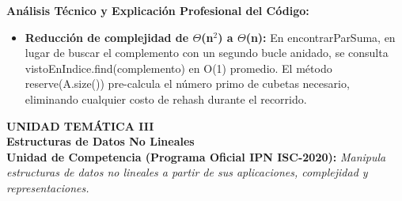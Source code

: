 \documentclass[11pt,letterpaper]{article}
\begin{document}
\noindent\textbf{\color{ipnguinda}Análisis Técnico y Explicación Profesional del Código:}\par\vspace{-2pt}
\begin{itemize}
\setlength{\itemsep}{2pt}\setlength{\parskip}{0pt}
  \item \textbf{Reducción de complejidad de $\Theta$(n$^2$) a $\Theta$(n): }En encontrarParSuma, en lugar de buscar el complemento con un segundo bucle anidado, se consulta vistoEnIndice.find(complemento) en O(1) promedio. El método reserve(A.size()) pre-calcula el número primo de cubetas necesario, eliminando cualquier costo de rehash durante el recorrido.
\end{itemize}
\newpage
\noindent\colorbox{ipnguinda!10}{\parbox{\dimexpr\linewidth-2\fboxsep\relax}{\vspace{6pt}\textbf{\color{ipnblue}\small UNIDAD TEMÁTICA III}\\[4pt]\textbf{\color{ipnguinda}\LARGE Estructuras de Datos No Lineales}\\[6pt]\textbf{\color{ipnblue}Unidad de Competencia (Programa Oficial IPN ISC-2020):} \textit{Manipula estructuras de datos no lineales a partir de sus aplicaciones, complejidad y representaciones.}\vspace{6pt}}}\vspace{10pt}
\end{document}
